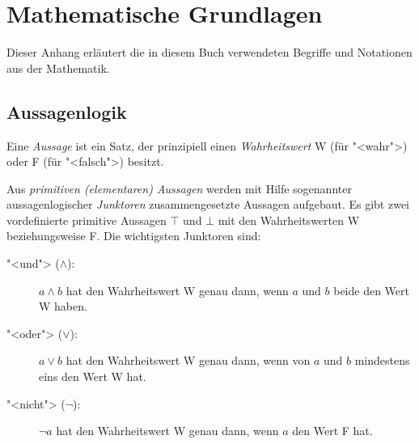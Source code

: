 
\chapter{Mathematische Grundlagen}
\label{cha:math}

Dieser Anhang erläutert
die in diesem Buch verwendeten Begriffe und Notationen
aus der Mathematik.

\section{Aussagenlogik}
\label{sec:aussagenlogik}

Eine \emph{Aussage} ist ein Satz, der prinzipiell einen \emph{Wahrheitswert}
W (für "<wahr">) oder F (für "<falsch">)
besitzt.



Aus \emph{primitiven (elementaren) Aussagen}
werden mit Hilfe sogenannter 
aussagenlogischer \emph{Junktoren} zusammengesetzte Aussagen
aufgebaut.  Es gibt zwei vordefinierte primitive Aussagen $\top$ und
$\bot$ mit den Wahrheitswerten W beziehungsweise F.  Die
wichtigsten Junktoren sind:
\begin{description}
\item["<und"> ($\wedge$):] $a \wedge b$ 
        hat den Wahrheitswert W genau dann, wenn
     $a$ und $b$ beide den Wert W haben.
\item["<oder"> ($\vee$):] $a \vee b$ 
        hat den Wahrheitswert W genau dann, wenn von
     $a$ und $b$ mindestens eins den Wert W hat.
\item["<nicht"> ($\neg$):] $\neg a$ 
        hat den Wahrheitswert W genau dann, wenn $a$   
     den Wert F hat.
\end{description}

